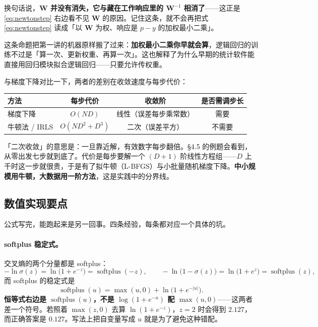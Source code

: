 \documentclass[11pt,a4paper,fontset=windows,zihao=-4]{ctexart}
\newcommand{\bW}{\mathbf{W}}
\newcommand{\abs}[1]{\lvert #1\rvert}
\DeclareMathOperator{\softplus}{softplus}
\newcommand{\tabhead}{\sffamily\bfseries\color{navy}}
\begin{document}
换句话说，\textbf{$\bW$ 并没有消失，它与藏在工作响应里的 $\bW^{-1}$ 相消了}——这正是 \eqref{eq:newtonstep} 右边看不见 $\bW$ 的原因。记住这条，就不会再把式 \eqref{eq:newtonstep} 读成「以 $\bW$ 为权、响应是 $p-y$ 的加权最小二乘」。

这条命题把第一讲的机器原样搬了过来：\textbf{加权最小二乘你早就会算}，逻辑回归的训练不过是「算一次、更新权重、再算一次」。这也解释了为什么早期的统计软件能直接用回归模块拟合逻辑回归——只要允许传权重。

与梯度下降对比一下，两者的差别在收敛速度与每步代价：

\begin{center}
\small
\begin{tabular}{@{}lccc@{}}
\toprule
\rowcolor{navy!7}
\tabhead 方法 & \tabhead 每步代价 & \tabhead 收敛阶 & \tabhead 是否需调步长\\
\midrule
梯度下降 & $O(ND)$ & 线性（误差每步乘常数） & 需要\\
牛顿法 / IRLS & $O(ND^{2}+D^{3})$ & 二次（误差平方） & 不需要\\
\bottomrule
\end{tabular}
\end{center}

「二次收敛」的意思是：一旦靠近解，有效数字每步翻倍。\S4.5 的例题会看到，从零出发七步就到底了。代价是每步要解一个 $(D+1)$ 阶线性方程组——$D$ 上千时这一步就很贵，于是有了拟牛顿（L-BFGS）与小批量随机梯度下降。\textbf{中小规模用牛顿，大数据用一阶方法}，这是实践中的分界线。

\subsection{数值实现要点}

公式写完，能跑起来是另一回事。四条经验，每条都对应一个具体的坑。

\paragraph{softplus 稳定式。}交叉熵的两个分量都是 softplus：
\begin{equation}
  -\ln\sigma(z)=\ln\bigl(1+e^{-z}\bigr)=\softplus(-z),\qquad
  -\ln\bigl(1-\sigma(z)\bigr)=\ln\bigl(1+e^{z}\bigr)=\softplus(z),
\end{equation}
而 softplus 的稳定式是
\begin{equation}
  \softplus(u)=\max(u,0)+\ln\bigl(1+e^{-\abs{u}}\bigr).
  \label{eq:softplus}
\end{equation}
\textbf{恒等式右边是 $\softplus(u)$，不是 $\log(1+e^{-u})$ 配 $\max(u,0)$}——这两者差一个符号。若照着 $\max(z,0)$ 去算 $\ln(1+e^{-z})$，$z=2$ 时会得到 $2.127$，而正确答案是 $0.127$。写法上把自变量写成 $u$ 就是为了避免这种错配。
\end{document}

